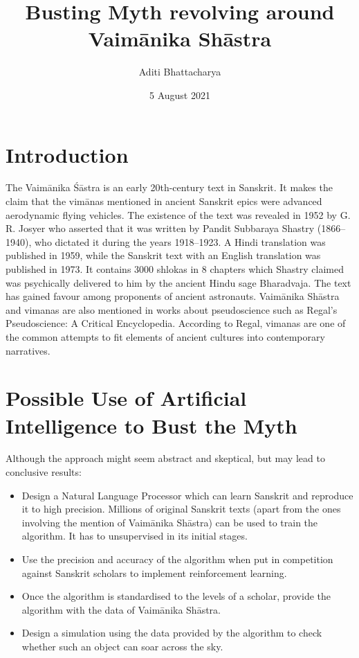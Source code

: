 \documentclass{article}
\title{Busting Myth revolving around Vaimānika Shāstra}
\author{Aditi Bhattacharya }
\date{5 August 2021}
\begin{document}
\maketitle

\section*{Introduction}
The Vaimānika Śāstra is an early 20th-century text in Sanskrit. It makes the claim that the vimānas mentioned in ancient Sanskrit epics were advanced aerodynamic flying vehicles.
\newline
The existence of the text was revealed in 1952 by G. R. Josyer who asserted that it was written by Pandit Subbaraya Shastry (1866–1940), who dictated it during the years 1918–1923. A Hindi translation was published in 1959, while the Sanskrit text with an English translation was published in 1973. It contains 3000 shlokas in 8 chapters which Shastry claimed was psychically delivered to him by the ancient Hindu sage Bharadvaja. The text has gained favour among proponents of ancient astronauts.
\newline
Vaimānika Shāstra and vimanas are also mentioned in works about pseudoscience such as Regal's Pseudoscience: A Critical Encyclopedia. According to Regal, vimanas are one of the common attempts to fit elements of ancient cultures into contemporary narratives.

\section*{Possible Use of Artificial Intelligence to Bust the Myth}
Although the approach might seem abstract and skeptical, but may lead to conclusive results:
\begin{itemize}
\item Design a Natural Language Processor which can learn Sanskrit and reproduce it to high precision.  Millions of original Sanskrit texts (apart from the ones involving the mention of Vaimānika Shāstra) can be used to train the algorithm. It has to unsupervised in its initial stages. 
\item Use the precision and accuracy of the algorithm when put in competition against Sanskrit scholars to implement reinforcement learning. 
\item Once the algorithm is standardised to the levels of a scholar, provide the algorithm with the data of Vaimānika Shāstra.
\item Design a simulation using the data provided by the algorithm to check whether such an object can soar across the sky.

\end{itemize}
\end{document}
